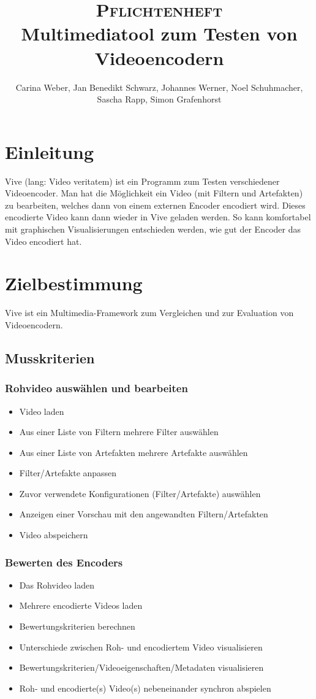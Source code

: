 \documentclass[parskip=full]{scrartcl}
\title{\fontsize{40}{48} \selectfont \textsc{Pflichtenheft}\\
{\fontsize{18}{18} \selectfont Multimediatool zum Testen von Videoencodern}}}
\author {Carina Weber, Jan Benedikt Schwarz, Johannes Werner, Noel Schuhmacher,\\
Sascha Rapp, Simon Grafenhorst}
\begin{document}
\maketitle
\thispagestyle{empty}
\newpage
\tableofcontents
\newpage
\section{Einleitung}
Vive (lang: Video veritatem) ist ein Programm zum Testen verschiedener Videoencoder. Man hat die Möglichkeit ein Video (mit Filtern und Artefakten) zu bearbeiten, welches dann von einem externen Encoder encodiert wird. Dieses encodierte Video kann dann wieder in Vive geladen werden. So kann komfortabel mit graphischen Visualisierungen entschieden werden, wie gut der Encoder das Video encodiert hat.
\newpage
\section{Zielbestimmung}
Vive ist ein Multimedia-Framework zum Vergleichen und zur Evaluation von Videoencodern.
\subsection{Musskriterien}
\subsubsection{Rohvideo auswählen und bearbeiten}
\begin{itemize}
\item Video laden
\item Aus einer Liste von Filtern mehrere Filter auswählen
\item Aus einer Liste von Artefakten mehrere Artefakte auswählen
\item Filter/Artefakte anpassen
\item Zuvor verwendete Konfigurationen (Filter/Artefakte) auswählen
\item Anzeigen einer Vorschau mit den angewandten Filtern/Artefakten
\item Video abspeichern
\end{itemize}
\subsubsection{Bewerten des Encoders}
\begin{itemize}
\item Das Rohvideo laden
\item Mehrere encodierte Videos laden
\item Bewertungskriterien berechnen
\item Unterschiede zwischen Roh- und encodiertem Video visualisieren
\item Bewertungskriterien/Videoeigenschaften/Metadaten visualisieren
\item Roh- und encodierte(s) Video(s) nebeneinander synchron abspielen
\end{itemize}
\newpage
\end{document}
